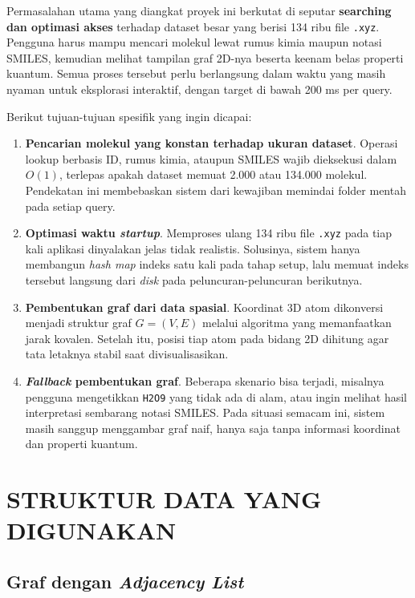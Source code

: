\documentclass[a4paper,12pt]{report}
\begin{document}
Permasalahan utama yang diangkat proyek ini berkutat di seputar \textbf{searching dan optimasi akses} terhadap dataset besar yang berisi 134 ribu file \texttt{.xyz}. Pengguna harus mampu mencari molekul lewat rumus kimia maupun notasi SMILES, kemudian melihat tampilan graf 2D-nya beserta keenam belas properti kuantum. Semua proses tersebut perlu berlangsung dalam waktu yang masih nyaman untuk eksplorasi interaktif, dengan target di bawah 200 ms per query.

Berikut tujuan-tujuan spesifik yang ingin dicapai:

\begin{enumerate}
    \item \textbf{Pencarian molekul yang konstan terhadap ukuran dataset}. Operasi lookup berbasis ID, rumus kimia, ataupun SMILES wajib dieksekusi dalam $O(1)$, terlepas apakah dataset memuat 2.000 atau 134.000 molekul. Pendekatan ini membebaskan sistem dari kewajiban memindai folder mentah pada setiap query.
    \item \textbf{Optimasi waktu \textit{startup}}. Memproses ulang 134 ribu file \texttt{.xyz} pada tiap kali aplikasi dinyalakan jelas tidak realistis. Solusinya, sistem hanya membangun \textit{hash map} indeks satu kali pada tahap setup, lalu memuat indeks tersebut langsung dari \textit{disk} pada peluncuran-peluncuran berikutnya.
    \item \textbf{Pembentukan graf dari data spasial}. Koordinat 3D atom dikonversi menjadi struktur graf $G = (V, E)$ melalui algoritma yang memanfaatkan jarak kovalen. Setelah itu, posisi tiap atom pada bidang 2D dihitung agar tata letaknya stabil saat divisualisasikan.
    \item \textbf{\textit{Fallback} pembentukan graf}. Beberapa skenario bisa terjadi, misalnya pengguna mengetikkan \texttt{H2O9} yang tidak ada di alam, atau ingin melihat hasil interpretasi sembarang notasi SMILES. Pada situasi semacam ini, sistem masih sanggup menggambar graf naif, hanya saja tanpa informasi koordinat dan properti kuantum.
\end{enumerate}

\chapter{STRUKTUR DATA YANG DIGUNAKAN}

\section{Graf dengan \textit{Adjacency List}}
\end{document}
